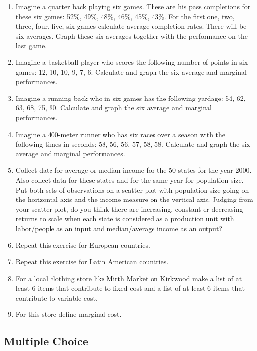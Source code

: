 \documentclass[
]{book}
\providecommand{\tightlist}{%
  \setlength{\itemsep}{0pt}\setlength{\parskip}{0pt}}
\begin{document}
\begin{enumerate}
\def\labelenumi{\arabic{enumi}.}
\tightlist
\item
  Imagine a quarter back playing six games. These are his pass completions for these six games: 52\%, 49\%, 48\%, 46\%, 45\%, 43\%. For the first one, two, three, four, five, six games calculate average completion rates. There will be six averages. Graph these six averages together with the performance on the last game.\\
\item
  Imagine a basketball player who scores the following number of points in six games: 12, 10, 10, 9, 7, 6. Calculate and graph the six average and marginal performances.
\item
  Imagine a running back who in six games has the following yardage: 54, 62, 63, 68, 75, 80. Calculate and graph the six average and marginal performances.
\item
  Imagine a 400-meter runner who has six races over a season with the following times in seconds: 58, 56, 56, 57, 58, 58. Calculate and graph the six average and marginal performances.
\item
  Collect date for average or median income for the 50 states for the year 2000. Also collect data for these states and for the same year for population size. Put both sets of observations on a scatter plot with population size going on the horizontal axis and the income measure on the vertical axis. Judging from your scatter plot, do you think there are increasing, constant or decreasing returns to scale when each state is considered as a production unit with labor/people as an input and median/average income as an output?
\item
  Repeat this exercise for European countries.
\item
  Repeat this exercise for Latin American countries.
\item
  For a local clothing store like Mirth Market on Kirkwood make a list of at least 6 items that contribute to fixed cost and a list of at least 6 items that contribute to variable cost.
\item
  For this store define marginal cost.
\end{enumerate}

\hypertarget{multiple-choice-4}{%
\subsection{Multiple Choice}\label{multiple-choice-4}}
\end{document}

